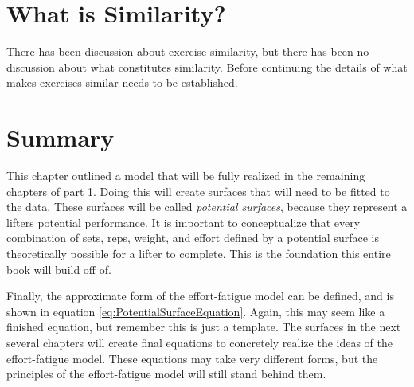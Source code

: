 

\section{What is Similarity?}
\label{sec:P2C1_WhatIsSimilarity}

There has been discussion about exercise similarity, but there has been no discussion about what constitutes similarity. Before continuing the details of what makes exercises similar needs to be established.






\section{Summary}

This chapter outlined a model that will be fully realized in the remaining chapters of part 1. Doing this will create surfaces that will need to be fitted to the data. These surfaces will be called \textit{potential surfaces}, because they represent a lifters potential performance. It is important to conceptualize that every combination of sets, reps, weight, and effort defined by a potential surface is theoretically possible for a lifter to complete. This is the foundation this entire book will build off of.

Finally, the approximate form of the effort-fatigue model can be defined, and is shown in equation \ref{eq:PotentialSurfaceEquation}. Again, this may seem like a finished equation, but remember this is just a template. The surfaces in the next several chapters will create final equations to concretely realize the ideas of the effort-fatigue model. These equations may take very different forms, but the principles of the effort-fatigue model will still stand behind them.

